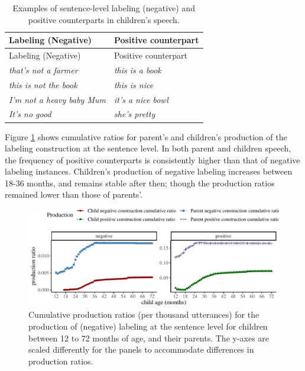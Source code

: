 \documentclass[
  man,floatsintext]{apa6}
\begin{document}
\begin{longtable}[]{@{}ll@{}}
\caption{\label{tab:label} Examples of sentence-level labeling (negative) and positive counterparts in children's speech.}\tabularnewline
\toprule\noalign{}
Labeling (Negative) & Positive counterpart \\
\midrule\noalign{}
\endfirsthead
\toprule\noalign{}
Labeling (Negative) & Positive counterpart \\
\midrule\noalign{}
\endhead
\bottomrule\noalign{}
\endlastfoot
\emph{that's not a farmer} & \emph{this is a book} \\
\emph{this is not the book} & \emph{this is nice} \\
\emph{I'm not a heavy baby Mum} & \emph{it's a nice bowl} \\
\emph{It's no good} & \emph{she's pretty} \\
\end{longtable}

Figure \ref{fig:learning} shows cumulative ratios for parent's and children's production of the labeling construction at the sentence level. In both parent and children speech, the frequency of positive counterparts is consistently higher than that of negative labeling instances. Children's production of negative labeling increases between 18-36 months, and remains stable after then; though the production ratios remained lower than those of parents'.

\begin{figure}[H]

{\centering \includegraphics{neg_construction_article_files/figure-latex/learning-1} 

}

\caption{Cumulative production ratios (per thousand utterances) for the production of (negative) labeling at the sentence level for children between 12 to 72 months of age, and their parents. The y-axes are scaled differently for the panels to accommodate differences in production ratios.}\label{fig:learning}
\end{figure}
\end{document}

